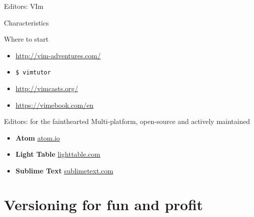 \documentclass[10pt]{beamer}
\begin{document}
\begin{frame}{Editors: VIm}
{\begin{block}{Characteristics}
\begin{itemize}
			\end{itemize}
		\end{block}
		\begin{block}{Where to start}
			\begin{itemize}
				\item \url{http://vim-adventures.com/}
				\item \texttt{\$ vimtutor}
				\item \url{http://vimcasts.org/}
				\item \url{https://vimebook.com/en}
			\end{itemize}
		\end{block}
	}
\end{frame}


\begin{frame}{Editors: for the fainthearted} %
	\large
	Multi-platform, open-source and actively maintained

	\medskip

	\begin{itemize}
		\item \textbf{Atom} \hfill \url{atom.io}
		\item \textbf{Light Table} \hfill \url{lighttable.com}
		\item \textbf{Sublime Text} \hfill \url{sublimetext.com}
	  \end{itemize}

\end{frame}

\section{Versioning for fun and profit} %
\end{document}
